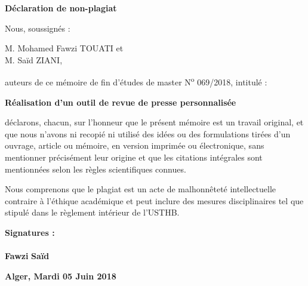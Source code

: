 \newpage
\vspace*{1.2cm}
\begin{center}
    \Large
    \textbf{Déclaration de non-plagiat}
\end{center}
\vspace*{2.5cm}
Nous, soussignés :
\vspace*{0.5cm}

M. Mohamed Fawzi TOUATI et\\
M. Saïd ZIANI,
\vspace*{1cm}

auteurs de ce mémoire de fin d'études de master N\textsuperscript{o} 069/2018, intitulé :
\begin{center}
\large
\textbf{
Réalisation d'un outil de revue de presse personnalisée
}
\end{center}
\vspace*{1.2cm}


déclarons, chacun, sur l'honneur que le présent mémoire est un travail original, et que nous n'avons ni recopié ni utilisé des idées ou des formulations tirées d'un ouvrage, article ou mémoire, en version imprimée ou électronique, sans mentionner précisément leur origine et que les citations intégrales sont mentionnées selon les règles scientifiques connues. 

Nous comprenons que le plagiat est un acte de malhonnêteté intellectuelle contraire à l'éthique académique et peut inclure des mesures disciplinaires tel que stipulé dans le règlement intérieur de l'USTHB.


\vspace*{3cm}
\textbf{Signatures :}\\\\
\hspace*{3cm}
\textbf{Fawzi}
\hspace*{6cm}
\textbf{Saïd}


\vspace*{3cm}
\hspace*{9cm}
\textbf{Alger, Mardi 05 Juin 2018}
